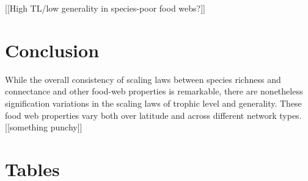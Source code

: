 \documentclass[12pt]{article}
\begin{document}
[[High TL/low generality in species-poor food webs?]]



\section*{Conclusion}

While the overall consistency of scaling laws between species richness and connectance and other food-web properties is 
remarkable, there are nonetheless signification variations in the scaling laws of trophic level and generality. These food web 
properties vary both over latitude and across different network types. [[something punchy]]

\newpage

\newpage

\section*{Tables}
\end{document}
